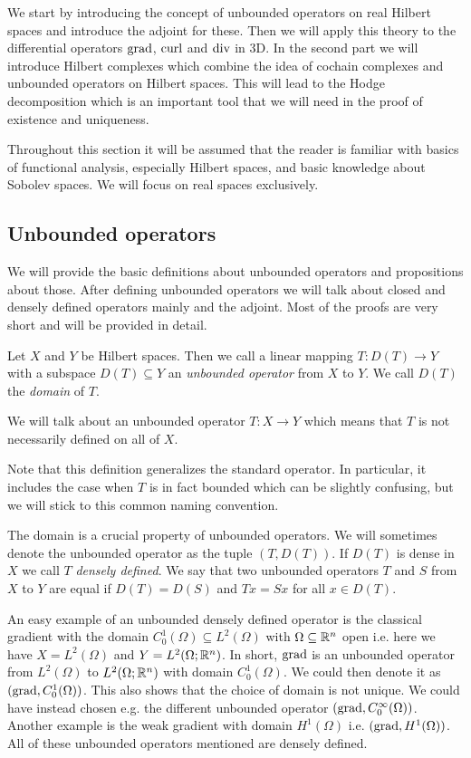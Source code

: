 \documentclass[../master_thesis.tex]{subfiles}
\begin{document}
We start by introducing the concept of unbounded operators on real Hilbert spaces and 
introduce the adjoint for these. Then we will apply this theory to 
the differential operators $\operatorname{grad}$, $\operatorname{curl}$ and $\operatorname{div}$ in 3D. In the 
second part we will introduce Hilbert complexes which combine the idea 
of cochain complexes and unbounded operators on Hilbert spaces. This will lead to the 
Hodge decomposition which is an important tool that we will need in the proof of 
existence and uniqueness.

Throughout this section 
it will be assumed that the reader is familiar with basics of functional analysis, 
especially Hilbert spaces, 
and basic knowledge about Sobolev spaces. We will focus on real spaces 
exclusively.

\subsection{Unbounded operators}\label{sec:unbounded_operators}

We will provide the basic definitions about unbounded operators and propositions 
about those. After defining unbounded operators we will talk about closed and 
densely defined operators mainly and the adjoint. 
Most of the proofs are very short and will be provided in detail. 

\begin{definition}
    Let $X$ and $Y$ be Hilbert spaces. Then we call a linear mapping 
    $T: D(T) \rightarrow Y$ with a subspace $D(T) \subseteq Y$ an 
    \textit{unbounded 
    operator} from $X$ to $Y$. We call $D(T)$ the \textit{domain} of $T$.
\end{definition}
We will talk about an unbounded operator $T:X \rightarrow Y$ 
which means that $T$ is not necessarily defined on all of $X$. 

Note that this definition generalizes the standard operator. In particular, 
it includes the case when $T$ is in fact bounded which can be 
slightly confusing, but we will stick to this common naming convention. 

The domain is a crucial property of unbounded operators. We will sometimes 
denote the unbounded operator as the tuple $(T,D(T))$.
If $D(T)$ is dense in $X$ we call $T$ \textit{densely defined}. 
We say that two unbounded operators $T$ and $S$ from $X$ to $Y$ are equal 
if $D(T) = D(S)$ and $Tx = Sx$ for all $x\in D(T)$.

An easy
example of an unbounded densely defined operator is the classical gradient with 
the domain $C_0^1(\Omega) \subseteq L^2 (\Omega)$ 
with $\Omega \subseteq \mathbb{R}^n$ open i.e. here we have $X=L^2(\Omega)$ and 
$Y=L^2(\Omega;\mathbb{R}^n)$.
In short, $\operatorname{grad}$ is an unbounded operator from $L^2(\Omega)$ to 
$L^2(\Omega;\mathbb{R}^n)$ with domain $C_0^1(\Omega)$.
We could then denote it as $(\operatorname{grad}, C_0^1(\Omega))$. This also shows that 
the choice of domain is not unique. We could have instead chosen e.g. the 
different unbounded operator $(\operatorname{grad}, C_0^\infty (\Omega))$. 
Another example is the weak gradient with domain $H^1(\Omega)$ i.e.
$(\operatorname{grad}, H^1(\Omega))$. All of these unbounded operators mentioned are densely defined.
\end{document}
